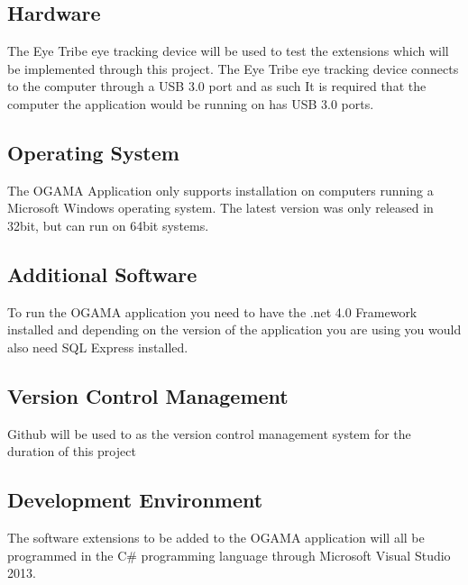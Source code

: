 \subsection{Hardware}
The Eye Tribe eye tracking device will be used to test the extensions which will be implemented through this project. The Eye Tribe eye tracking device  connects to the computer through a USB 3.0 port and as such It is required that the computer the application would be running on has USB 3.0 ports. 
\subsection{Operating System}
The OGAMA Application only supports installation on computers running a Microsoft Windows operating system. The latest version was only released in 32bit, but can run on 64bit systems.
\subsection{Additional Software}
To run the OGAMA application you need to have the .net 4.0 Framework installed and depending on the version of the application you are using you would also need SQL Express installed.
\subsection{Version Control Management}
Github will be used to as the version control management system for the duration of this project
\subsection{Development Environment}
The software extensions to be added to the OGAMA application will all be programmed in the C# programming language through Microsoft Visual Studio 2013.
